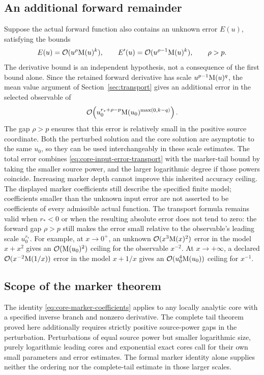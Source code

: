\subsection{An additional forward remainder}

Suppose the actual forward function also contains an unknown error $E(u)$,
satisfying the bounds
\begin{equation}
 E(u)=\mathcal O(u^\rho\mathrm M(u)^k),\qquad
 E'(u)=\mathcal O(u^{\rho-1}\mathrm M(u)^k),\qquad \rho>p.
 \label{eq:core-declared-input-error}
\end{equation}
The derivative bound is an independent hypothesis, not a consequence
of the first bound alone. Since the retained forward derivative has scale
$u^{p-1}\mathrm M(u)^q$, the mean value argument of
Section~\ref{sec:transport} gives an additional error in the selected
observable of
\begin{equation}
 \mathcal O\!\left(u_0^{r_*+\rho-p}
       \mathrm M(u_0)^{\max(0,k-q)}\right).
 \label{eq:core-input-error-transport}
\end{equation}
The gap $\rho>p$ ensures that this error is relatively small in the
positive source coordinate. Both the perturbed solution and the core
solution are asymptotic to the same $u_0$, so they can be used
interchangeably in these scale estimates. The total error combines
\eqref{eq:core-input-error-transport} with the marker-tail bound by taking
the smaller source power, and the larger logarithmic degree if those
powers coincide. Increasing marker depth cannot improve this inherited
accuracy ceiling. The displayed marker coefficients still describe the
specified finite model; coefficients smaller than the unknown input error
are not asserted to be coefficients of every admissible actual function.
The transport formula remains valid when $r_*<0$ or when the resulting
absolute error does not tend to zero: the forward gap $\rho>p$ still makes
the error small relative to the observable's leading scale $u_0^{r_*}$.
For example, at $x\to0^+$, an unknown $\mathcal O(x^3\mathrm M(x)^2)$ error in the
model $x+x^2$ gives an $\mathcal O(\mathrm M(u_0)^2)$ ceiling for the observable $x^{-2}$.
At $x\to+\infty$, a declared $\mathcal O(x^{-2}\mathrm M(1/x))$ error in the model
$x+1/x$ gives an $\mathcal O(u_0^4\mathrm M(u_0))$ ceiling for $x^{-1}$.

\subsection{Scope of the marker theorem}

The identity \eqref{eq:core-marker-coefficients} applies to any locally analytic
core with a specified inverse branch and nonzero derivative. The complete
tail theorem proved here additionally requires strictly positive
source-power gaps in the perturbation. Perturbations of equal source power
but smaller logarithmic size, purely logarithmic leading cores and
exponential exact cores call for their own small parameters and error
estimates. The formal marker identity alone supplies neither the ordering
nor the complete-tail estimate in those larger scales.
